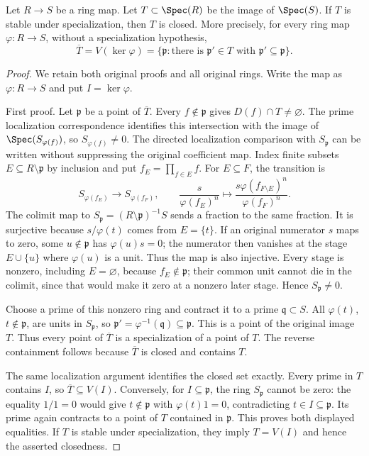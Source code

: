 \begin{lemma}
\label{editorial-source-lemma-image-stable-specialization-closed}
Let $R \to S$ be a ring map. Let $T \subset \Spec(R)$
be the image of $\Spec(S)$. If $T$ is stable under specialization,
then $T$ is closed. More precisely, for every ring map
$\varphi:R\to S$, without a specialization hypothesis,
$$
\overline T=V(\ker\varphi)
=\{\mathfrak p:\text{there is }\mathfrak p'\in T
\text{ with }\mathfrak p'\subseteq\mathfrak p\}.
$$
\end{lemma}

\begin{proof}
We retain both original proofs and all original rings.
Write the map as $\varphi:R\to S$ and put $I=\ker\varphi$.

\medskip\noindent
First proof. Let $\mathfrak p$ be a point of $\overline T$.
Every $f\notin\mathfrak p$ gives $D(f)\cap T\ne\varnothing$.
The prime localization correspondence identifies this
intersection with the image of $\Spec(S_{\varphi(f)})$,
so $S_{\varphi(f)}\ne0$.
The directed localization comparison with $S_{\mathfrak p}$
can be written without suppressing the original coefficient map.
Index finite subsets $E\subseteq R\setminus\mathfrak p$
by inclusion and put $f_E=\prod_{f\in E}f$.
For $E\subseteq F$, the transition is
$$
S_{\varphi(f_E)}\longrightarrow S_{\varphi(f_F)},\qquad
\frac{s}{\varphi(f_E)^n}\longmapsto
\frac{s\varphi(f_{F\setminus E})^n}{\varphi(f_F)^n}.
$$
The colimit map to $S_{\mathfrak p}=(R\setminus\mathfrak p)^{-1}S$
sends a fraction to the same fraction. It is surjective
because $s/\varphi(t)$ comes from $E=\{t\}$.
If an original numerator $s$ maps to zero, some
$u\notin\mathfrak p$ has $\varphi(u)s=0$; the numerator
then vanishes at the stage $E\cup\{u\}$ where
$\varphi(u)$ is a unit. Thus the map is also injective.
Every stage is nonzero, including $E=\varnothing$,
because $f_E\notin\mathfrak p$; their common unit
cannot die in the colimit, since that would make it
zero at a nonzero later stage. Hence $S_{\mathfrak p}\ne0$.

Choose a prime of this nonzero ring and contract it
to a prime $\mathfrak q\subset S$. All
$\varphi(t)$, $t\notin\mathfrak p$, are units in
$S_{\mathfrak p}$, so
$\mathfrak p'=\varphi^{-1}(\mathfrak q)\subseteq\mathfrak p$.
This is a point of the original image $T$.
Thus every point of $\overline T$ is a specialization
of a point of $T$. The reverse containment follows
because $\overline T$ is closed and contains $T$.

The same localization argument identifies the closed set
exactly. Every prime in $T$ contains $I$, so
$\overline T\subseteq V(I)$. Conversely, for
$I\subseteq\mathfrak p$, the ring $S_{\mathfrak p}$
cannot be zero: the equality $1/1=0$ would give
$t\notin\mathfrak p$ with $\varphi(t)1=0$,
contradicting $t\in I\subseteq\mathfrak p$.
Its prime again contracts to a point of $T$ contained
in $\mathfrak p$. This proves both displayed equalities.
If $T$ is stable under specialization, they imply
$T=V(I)$ and hence the asserted closedness.


\end{proof}
